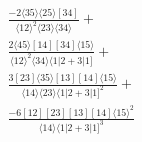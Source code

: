 \documentclass[varwidth, border=5pt]{standalone}
\begin{document}
\begin{my}
$\begin{gathered}
\scriptscriptstyle\frac{-2⟨35⟩⟨25⟩[34]}{⟨12⟩^2⟨23⟩⟨34⟩}+\\
\scriptscriptstyle\frac{2⟨45⟩[14][34]⟨15⟩}{⟨12⟩^2⟨34⟩⟨1|2+3|1]}+\\
\scriptscriptstyle\frac{3[23]⟨35⟩[13][14]⟨15⟩}{⟨14⟩⟨23⟩⟨1|2+3|1]^2}+\\
\scriptscriptstyle\frac{-6[12][23][13][14]⟨15⟩^2}{⟨14⟩⟨1|2+3|1]^3}\phantom{+}
\end{gathered}$
\end{my}
\end{document}
